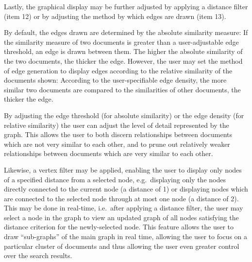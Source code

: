 Lastly, the graphical display may be further adjusted by applying a distance filter (item 12) or by adjusting the method by which edges are drawn (item 13).

By default, the edges drawn are determined by the absolute similarity measure: If the similarity measure of two documents is greater than a user-adjustable edge threshold, an edge is drawn between them. The higher the absolute similarity of the two documents, the thicker the edge. However, the user may set the method of edge generation to display edges according to the relative similarity of the documents shown: According to the user-specifiable edge density, the more similar two documents are compared to the similarities of other documents, the thicker the edge.

By adjusting the edge threshold (for absolute similarity) or the edge density (for relative similarity) the user can adjust the level of detail represented by the graph. This allows the user to both discern relationships between documents which are not very similar to each other, and to prune out relatively weaker relationships between documents which are very similar to each other.

Likewise, a vertex filter may be applied, enabling the user to display only nodes of a specified distance from a selected node, e.g.\ displaying only the nodes directly connected to the current node (a distance of 1) or displaying nodes which are connected to the selected node through at most one node (a distance of 2). This may be done in real-time, i.e.\ after applying a distance filter, the user may select a node in the graph to view an updated graph of all nodes satisfying the distance criterion for the newly-selected node. This feature allows the user to draw ``sub-graphs'' of the main graph in real time, allowing the user to focus on a particular cluster of documents and thus allowing the user even greater control over the search results.